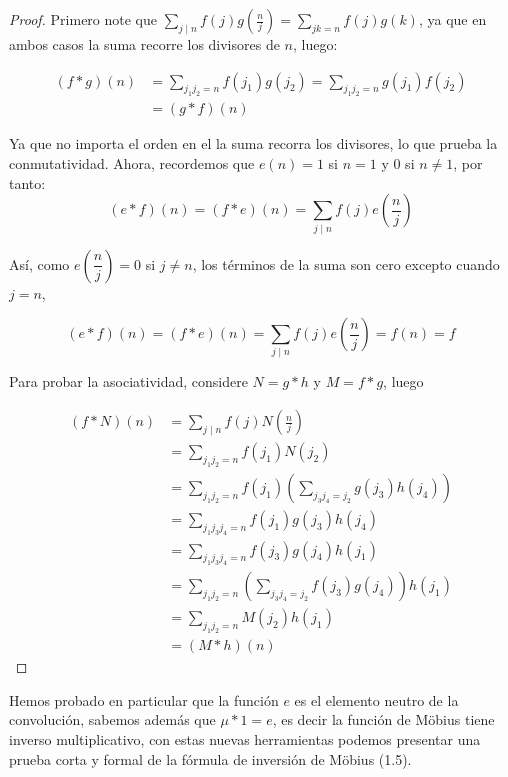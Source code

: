 \begin{proof}

Primero note que $\displaystyle\sum_{j\mid n} f(j)g \left( \frac{n}{j} \right)=\sum_{jk=n} f(j)g(k)$, ya que en ambos casos la suma recorre los divisores de $n$, luego:

$$\begin{aligned}
(f * g)(n) & =\sum_{j_1 j_2=n} f\left(j_1\right) g\left(j_2\right )=\sum_{j_1 j_2=n} g\left(j_1\right) f\left(j_2\right) \\
& =(g * f)(n)
\end{aligned}$$

Ya que no importa el orden en el la suma recorra los divisores, lo que prueba la conmutatividad. Ahora, recordemos que $e(n)=1$ si $n=1$ y 0 si $n\neq 1$, por tanto:
$$(e*f)(n)=(f*e)(n)=\sum_{j\mid n}f(j)e \left( \frac{n}{j} \right)$$

Así, como $e \left( \dfrac{n}{j} \right)=0$ si $j\neq n$, los términos de la suma son cero excepto cuando $j=n$, 

$$(e*f)(n)=(f*e)(n)=\sum_{j\mid n}f(j)e \left( \frac{n}{j} \right)=f(n)=f$$

Para probar la asociatividad, considere $N=g*h$ y $M=f*g$, luego

$$
\begin{aligned}
(f * N)(n) & =\sum_{j \mid n} f(j) N\left(\frac{n}{j}\right) \\
& =\sum_{j_1 j_2=n} f\left(j_1\right) N\left(j_2\right) \\
& =\sum_{j_1 j_2=n} f\left(j_1\right)\left(\sum_{j_3 j_4=j_2} g\left(j_3\right) h\left(j_4\right)\right) \\
& =\sum_{j_1 j_3 j_4=n} f\left(j_1\right) g\left(j_3\right) h\left(j_4\right)\\
& =\sum_{j_1 j_3 j_4=n} f\left(j_3\right) g\left(j_4\right) h\left(j_1\right)\\
& =\sum_{j_1 j_2=n}\left(\sum_{j_3 j_4=j_2} f\left(j_3\right) g\left(j_4\right)\right) h\left(j_1\right)\\
& =\sum_{j_1 j_2=n} M\left(j_2\right) h\left(j_1\right)\\
&=(M * h)(n)
\end{aligned}
$$

\end{proof}

Hemos  probado en particular que la función $e$ es el elemento neutro de la convolución, sabemos además que $\mu *1=e$, es decir la función de Möbius tiene inverso multiplicativo, con estas nuevas herramientas podemos presentar una prueba corta y formal de la fórmula de inversión de Möbius (1.5).

